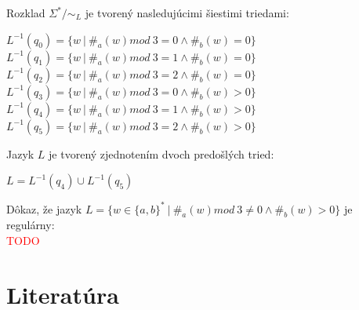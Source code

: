 \documentclass[11pt,a4paper]{article}
\newcommand{\red}[1]{\textcolor{red}{#1}}
\begin{document}
Rozklad $\Sigma^* / \sim_L$ je tvorený nasledujúcimi šiestimi triedami:

\begin{center}
$L^{-1}(q_0) = \{w\ |\ \#_a(w) mod\ 3 = 0 \wedge \#_b(w) = 0\}$\\
$L^{-1}(q_1) = \{w\ |\ \#_a(w) mod\ 3 = 1 \wedge \#_b(w) = 0\}$\\
$L^{-1}(q_2) = \{w\ |\ \#_a(w) mod\ 3 = 2 \wedge \#_b(w) = 0\}$\\
$L^{-1}(q_3) = \{w\ |\ \#_a(w) mod\ 3 = 0 \wedge \#_b(w) > 0\}$\\
$L^{-1}(q_4) = \{w\ |\ \#_a(w) mod\ 3 = 1 \wedge \#_b(w) > 0\}$\\
$L^{-1}(q_5) = \{w\ |\ \#_a(w) mod\ 3 = 2 \wedge \#_b(w) > 0\}$\\
\end{center}

Jazyk $L$ je tvorený zjednotením dvoch predošlých tried:

\begin{center}
$L = L^{-1}(q_4) \cup L^{-1}(q_5)$\\
\end{center}

Dôkaz, že jazyk $L = \{w \in \{a,b\}^*\ |\ \#_a(w) mod\ 3 \neq 0 \wedge \#_b(w) > 0\}$ je regulárny:\\

\red{TODO}

\newpage
\section{Literatúra}

\begin{flushleft}
    
\end{flushleft}
\end{document}
